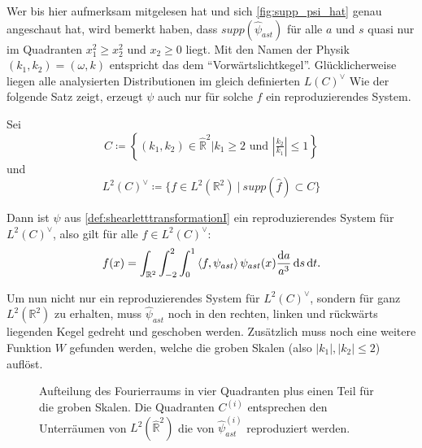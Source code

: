 Wer bis hier aufmerksam mitgelesen hat und sich \cref{fig:supp_psi_hat} genau angeschaut hat, wird bemerkt haben, dass $supp(\hat\psi_{ast})$ für alle $a$ und $s$ quasi nur im Quadranten $x_1^2 \geq x_2^2$ und $x_2 \geq 0$ liegt.
Mit den Namen der Physik $(k_1, k_2) = (\omega, k)$ entspricht das dem "`Vorwärtslichtkegel"'. Glücklicherweise liegen alle analysierten Distributionen im gleich definierten $L(C)^\vee$
Wie der folgende Satz zeigt, erzeugt $\psi$ auch nur für solche $f$ ein reproduzierendes System.

\begin{theorem}
\label{thm:shearlets_reproduzieren}
    Sei
    \begin{equation*}
        C \coloneqq \left\{(k_1,k_2)\in \hat{\mathbb{R}}^2
        \Big| k_1 \geq 2 \textrm{ und } \left\lvert\tfrac{k_2}{k_1}\right\rvert \leq 1
        \right\}
    \end{equation*}
    und
    \begin{equation}
        L^2(C)^\vee \coloneqq \{f \in L^2(\mathbb{R}^2) ~|~ supp (\hat f) \subset C\}
        \label{eq:L2_cone}
    \end{equation}

    Dann ist $\psi$ aus \cref{def:shearletttransformationI} ein reproduzierendes System für $L^2(C)^\vee$, also gilt für alle
    $f \in L^2(C)^\vee$:
    \begin{equation}
        f(x) = \int_{\mathbb{R}^2} \int_{-2}^2 \int_0^1
                \left\langle f,\psi_{ast}\right\rangle \psi_{ast}(x)
                \frac{\mathop{}\!\mathrm{d} a}{a^3} \mathop{}\!\mathrm{d} s \mathop{}\!\mathrm{d} t.
    \end{equation}
\end{theorem}

Um nun nicht nur ein reproduzierendes System für $L^2(C)^\vee$, sondern für ganz $L^2(\mathbb{R}^2)$ zu erhalten, muss $\hat \psi_{ast}$ noch in den rechten, linken und rückwärts liegenden Kegel gedreht und geschoben werden. Zusätzlich muss noch eine weitere Funktion $W$ gefunden werden, welche die groben Skalen (also $|k_1|, |k_2| \leq 2$) auflöst.

\begin{figure}[h]
\centering

\caption{Aufteilung des Fourierraums in vier Quadranten plus einen Teil für die groben Skalen. Die Quadranten $C^{(i)}$ entsprechen den Unterräumen von $L^2(\hat{\mathbb{R}}^2)$ die von $\hat \psi_{ast}^{(i)}$ reproduziert werden.}
\label{fig:quadrants}
\end{figure}


